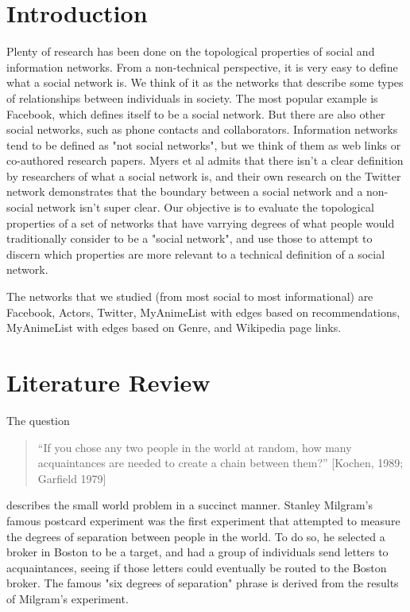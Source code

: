 \documentclass[prodmode,acmtecs]{acmsmall} %
\begin{document}
\section{Introduction}
Plenty of research has been done on the topological properties of social and information networks. From a non-technical perspective, 
it is very easy to define what a social network is. We think of it as the networks that describe some types of relationships between 
individuals in society. The most popular example is Facebook, which defines itself to be a social network. But there are also other 
social networks, such as phone contacts and collaborators. Information networks tend to be defined as "not social networks", but we
think of them as web links or co-authored research papers. Myers et al admits that there isn't a clear definition by researchers of
what a social network is, and their own research on the Twitter network demonstrates that the boundary between a social network and
a non-social network isn't super clear. Our objective is to evaluate the topological properties of a set of networks that have varrying degrees 
of what people would traditionally consider to be a "social network", and use those to attempt to discern which properties are more 
relevant to a technical definition of a social network.

The networks that we studied (from most social to most informational) are Facebook, Actors, Twitter, MyAnimeList with edges based on recommendations,
MyAnimeList with edges based on Genre, and Wikipedia page links. 

\section{Literature Review}
The question 
\begin{quote}
``If you chose any two people in the world at random, how many acquaintances are needed to create a chain between them?''
[Kochen, 1989; Garfield 1979] 
\end{quote} 
describes the small world problem in a succinct manner. Stanley Milgram's famous postcard experiment was the 
first experiment that attempted to measure the degrees of separation between people in the world. To do so, he selected
a broker in Boston to be a target, and had a group of individuals send letters to acquaintances, seeing if those letters
could eventually be routed to the Boston broker. The famous "six degrees of separation" phrase is derived from the results 
of Milgram's experiment.
\end{document}
